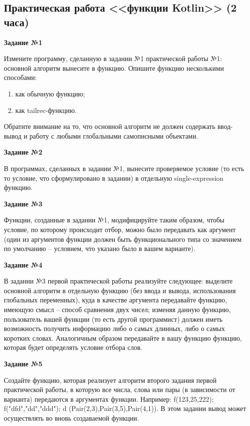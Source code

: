 \subsection{Практическая работа <<функции Kotlin>> (2 часа)}

\textbf{Задание №1} %

Измените программу, сделанную в задании №1 практической работы №1: основной алгоритм вынесите в функцию. 
Опишите функцию несколькими способами: 
\begin{enumerate}
	\item как обычную функцию;
	\item как tailrec-функцию.
\end{enumerate}

Обратите внимание на то, что основной алгоритм не должен содержать ввод-вывод и работу с любыми глобальными самописными объектами.

\textbf{Задание №2} %

В программах, сделанных в задании №1, вынесите проверяемое условие (то есть то условие, что сформулировано в задании)
в отдельную single-expression функцию. 

\textbf{Задание №3} %

Функции, созданные в задании №1, модифицируйте таким образом, чтобы условие, по которому происходит отбор, можно было передавать как
аргумент (один из аргументов функции должен быть функционального типа со значением по умолчанию -- условием, что указано было в вашем варианте).

\textbf{Задание №4} %

В задании №3 первой практической работы реализуйте следующее: выделите основной алгоритм в отдельную функцию (без ввода и вывода, использования
глобальных переменных), куда в качестве аргумента передавайте функцию, имеющую смысл -- способ сравнения двух чисел; 
изменяя данную функцию, пользователь вашей функции (то есть другой программист) должен иметь возможность получить
информацию либо о самых длинных, либо о самых коротких словах. Аналогичным образом передавайте в вашу функцию функцию, которая будет
определять условие отбора слов.

\textbf{Задание №5} %

Создайте функцию, которая реализует алгоритм второго задания первой практической работы, в которую все числа, слова или пары (в зависимости от варианта)
передаются в аргументах функции. Например: f(123,25,222); f("dfd","dd","ddd"); d (Pair(2,3),Pair(3,5),Pair(4,1)). В этом задании вывод может осуществлять
во вновь создаваемой функции.

